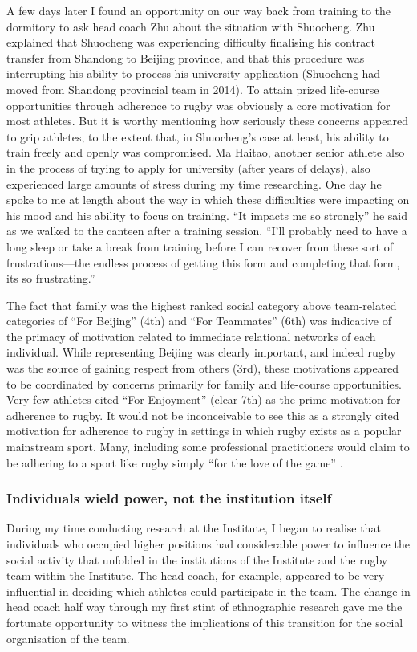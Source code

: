 \begin{CJK}{UTF8}{gbsn}
A few days later I found an opportunity on our way back from training to the dormitory to ask head coach Zhu about the situation with Shuocheng.  Zhu explained that Shuocheng was experiencing difficulty finalising his contract transfer from Shandong to Beijing province, and that this procedure was interrupting his ability to process his university application (Shuocheng had moved from Shandong provincial team in 2014). To attain prized life-course opportunities through adherence to rugby was obviously a core motivation for most athletes.  But it is worthy mentioning how seriously these concerns appeared to grip athletes, to the extent that, in Shuocheng's case at least, his ability to train freely and openly was compromised.  Ma Haitao, another senior athlete also in the process of trying to apply for university (after years of delays), also experienced large amounts of stress during my time researching.  One day he spoke to me at length about the way in which these difficulties were impacting on his mood and his ability to focus on training. ``It impacts me so strongly'' he said as we walked to the canteen after a training session.  ``I’ll probably need to have a long sleep or take a break from training before I can recover from these sort of frustrations---the endless process of getting this form and completing that form, its so frustrating.''

The fact that family was the highest ranked social category above team-related categories of ``For Beijing'' (4th) and ``For Teammates'' (6th) was indicative of the primacy of motivation related to immediate relational networks of each individual.  While representing Beijing was clearly important, and indeed rugby was the source of gaining respect from others (3rd), these motivations appeared to be coordinated by concerns primarily for family and life-course opportunities.  Very few athletes cited ``For Enjoyment'' (clear 7th) as the prime motivation for adherence to rugby.  It would not be inconceivable to see this as a strongly cited motivation for adherence to rugby in settings in which rugby exists as a popular mainstream sport.  Many, including some professional practitioners would claim to be adhering to a sport like rugby simply ``for the love of the game'' \citep{Jackson1998}.

\subsubsection{Individuals wield power, not the institution itself}
During my time conducting research at the Institute, I began to realise that individuals who occupied higher positions had considerable power to influence the social activity that unfolded in the institutions of the Institute and the rugby team within the Institute.   The head coach, for example, appeared to be very influential in deciding which athletes could participate in the team.  The change in head coach half way through my first stint of ethnographic research gave me the fortunate opportunity to witness the implications of this transition for the social organisation of the team.


\end{CJK}
